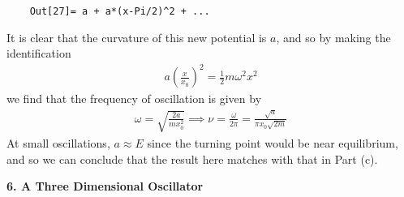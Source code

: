 \documentclass{article}
\theoremstyle{definition}
\newcommand{\f}[2]{\frac{#1}{#2}}
\newcommand{\lp}{\left(}
\newcommand{\rp}{\right)}
\begin{document}
\begin{enumerate}[label=(\alph*)]
\begin{lstlisting}
	Out[27]= a + a*(x-Pi/2)^2 + ...
	\end{lstlisting}
	
	It is clear that the curvature of this new potential is $a$, and so by making the identification
	\begin{align*}
	a\lp \f{x}{x_0} \rp^2 = \f{1}{2}m\omega^2 x^2 
	\end{align*}
	we find that the frequency of oscillation is given by 
	\begin{align*}
	\boxed{\omega = \sqrt{\f{2a}{mx_0^2}} \implies \nu = \f{\omega}{2\pi} = \f{\sqrt{a}}{\pi x_0\sqrt{2m}}}
	\end{align*}
	At small oscillations, $a\approx E$ since the turning point would be near equilibrium, and so we can conclude that the result here matches with that in Part (c). 
	
\end{enumerate}


\noindent \textbf{6. A Three Dimensional Oscillator}
\end{document}
